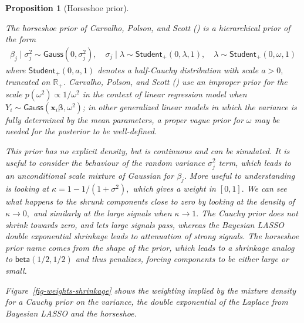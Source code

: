 \documentclass[
  11pt,
  letterpaper,
]{scrbook}
\theoremstyle{definition}
\theoremstyle{plain}
\theoremstyle{plain}
\theoremstyle{plain}
\newtheorem{proposition}{Proposition}[chapter]
\theoremstyle{definition}
\theoremstyle{definition}
\theoremstyle{remark}
\begin{document}
\begin{proposition}[Horseshoe
prior]\protect\hypertarget{prp-horseshoe}{}\label{prp-horseshoe}

The horseshoe prior of Carvalho, Polson, and Scott
() is a hierarchical
prior of the form \begin{align*}
\beta_j \mid \sigma^2_j \sim \mathsf{Gauss}(0, \sigma^2_j), \quad \sigma_j \mid \lambda \sim \mathsf{Student}_{+}(0, \lambda, 1), \quad \lambda \sim \mathsf{Student}_{+}(0, \omega, 1)
\end{align*} where \(\mathsf{Student}_{+}(0, a, 1)\) denotes a
half-Cauchy distribution with scale \(a>0,\) truncated on
\(\mathbb{R}_{+}\). Carvalho, Polson, and Scott
() use an improper prior
for the scale \(p(\omega^2) \propto 1/\omega^2\) in the context of
linear regression model when
\(Y_i \sim \mathsf{Gauss}(\mathbf{x}_i\boldsymbol{\beta}, \omega^2)\);
in other generalized linear models in which the variance is fully
determined by the mean parameters, a proper vague prior for \(\omega\)
may be needed for the posterior to be well-defined.

This prior has no explicit density, but is continuous and can be
simulated. It is useful to consider the behaviour of the random variance
\(\sigma^2_j\) term, which leads to an unconditional scale mixture of
Gaussian for \(\beta_j.\) More useful to understanding is looking at
\(\kappa = 1 - 1/(1+\sigma^2),\) which gives a weight in \([0,1].\) We
can see what happens to the shrunk components close to zero by looking
at the density of \(\kappa \to 0,\) and similarly at the large signals
when \(\kappa \to 1.\) The Cauchy prior does not shrink towards zero,
and lets large signals pass, whereas the Bayesian LASSO double
exponential shrinkage leads to attenuation of strong signals. The
horseshoe prior name comes from the shape of the prior, which leads to a
shrinkage analog to \(\mathsf{beta}(1/2, 1/2)\) and thus penalizes,
forcing components to be either large or small.

Figure~\ref{fig-weights-shrinkage} shows the weighting implied by the
mixture density for a Cauchy prior on the variance, the double
exponential of the Laplace from Bayesian LASSO and the horseshoe.

\begin{figure}[ht!]

\centering{

}
\end{figure}
\end{proposition}
\end{document}
